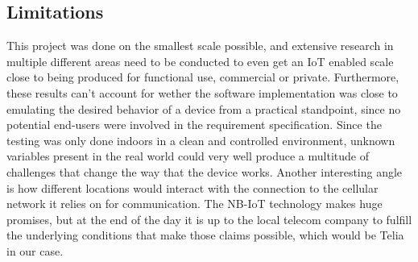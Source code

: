 \subsection{Limitations}
This project was done on the smallest scale possible, and extensive research in multiple different areas need to be conducted to even get an IoT enabled scale close to being produced for functional use, commercial or private.
Furthermore, these results can't account for wether the software implementation was close to emulating the desired behavior of a device from a practical standpoint, since no potential end-users were involved in the requirement specification.
Since the testing was only done indoors in a clean and controlled environment, unknown variables present in the real world could very well produce a multitude of challenges that change the way that the device works. Another interesting angle is how different locations would interact with the connection to the cellular network it relies on for communication. The NB-IoT technology makes huge promises, but at the end of the day it is up to the local telecom company to fulfill the underlying conditions that make those claims possible, which would be Telia in our case.
